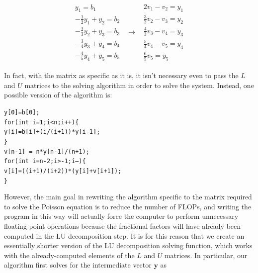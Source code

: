 \documentclass[12pt]{article}
\numberwithin{equation}{section}
\begin{document}
\begin{equation}
\label{eq:easylusolver}
\begin{array}{ccc}
\begin{array}{c}
y_{1}=b_{1} \\
-\frac{1}{2}y_{1}+y_{2}=b_{2} \\
-\frac{2}{3}y_{2}+y_{3}=b_{3} \\
-\frac{3}{4}y_{3}+y_{4}=b_{4} \\
-\frac{4}{5}y_{4}+y_{5}=b_{5}
\end{array} & \rightarrow &
\begin{array}{c}
2v_{1}-v_{2}=y_{1} \\
\frac{3}{2}v_{2}-v_{3}=y_{2} \\
\frac{4}{3}v_{3}-v_{4}=y_{3} \\
\frac{5}{4}v_{4}-v_{5}=y_{4} \\
\frac{6}{5}v_{5}=y_{5}
\end{array}
\end{array}
\end{equation}

\noindent In fact, with the matrix as specific as it is, it isn't necessary even to pass the $L$ and $U$ matrices to the solving algorithm in order to solve the system.  Instead, one possible version of the algorithm is:

\begin{1stlisting}
\texttt{y[0]=b[0]; \\ \indent for(int i=1;i<n;i++)\{ \\ \indent\indent y[i]=b[i]+(i/(i+1))*y[i-1]; \\\indent \} \\\indent v[n-1] = n*y[n-1]/(n+1); \\ \indent
for(int i=n-2;i>-1;i--)\{ \\\indent \indent v[i]=((i+1)/(i+2))*(y[i]+v[i+1]); \\\indent \}}
\end{1stlisting}

\noindent However, the main goal in rewriting the algorithm specific to the matrix required to solve the Poisson equation is to reduce the number of FLOPs, and writing the program in this way will actually force the computer to perform unnecessary floating point operations because the fractional factors will have already been computed in the LU decomposition step.  It is for this reason that we create an essentially shorter version of the LU decomposition solving function, which works with the already-computed elements of the $L$ and $U$ matrices.  In particular, our algorithm first solves for the intermediate vector $\textbf{y}$ as 
\end{document}
